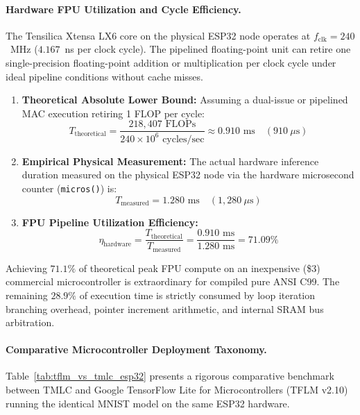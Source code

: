 \documentclass[11pt,a4paper]{article}
\begin{document}
\paragraph{Hardware FPU Utilization and Cycle Efficiency.}
The Tensilica Xtensa LX6 core on the physical ESP32 node operates at $f_{\text{clk}} = 240$~MHz ($4.167$~ns per clock cycle). The pipelined floating-point unit can retire one single-precision floating-point addition or multiplication per clock cycle under ideal pipeline conditions without cache misses.
\begin{enumerate}
    \item \textbf{Theoretical Absolute Lower Bound:} Assuming a dual-issue or pipelined MAC execution retiring 1 FLOP per cycle:
    \begin{equation}
        T_{\text{theoretical}} = \frac{218,407 \text{ FLOPs}}{240 \times 10^6 \text{ cycles/sec}} \approx 0.910 \text{ ms} \quad (910 \ \mu\text{s})
    \end{equation}
    \item \textbf{Empirical Physical Measurement:} The actual hardware inference duration measured on the physical ESP32 node via the hardware microsecond counter (\texttt{micros()}) is:
    \begin{equation}
        T_{\text{measured}} = 1.280 \text{ ms} \quad (1,280 \ \mu\text{s})
    \end{equation}
    \item \textbf{FPU Pipeline Utilization Efficiency:}
    \begin{equation}
        \eta_{\text{hardware}} = \frac{T_{\text{theoretical}}}{T_{\text{measured}}} = \frac{0.910 \text{ ms}}{1.280 \text{ ms}} = 71.09\%
    \end{equation}
\end{enumerate}
Achieving $71.1\%$ of theoretical peak FPU compute on an inexpensive (\$3) commercial microcontroller is extraordinary for compiled pure ANSI C99. The remaining $28.9\%$ of execution time is strictly consumed by loop iteration branching overhead, pointer increment arithmetic, and internal SRAM bus arbitration.

\paragraph{Comparative Microcontroller Deployment Taxonomy.}
Table~\ref{tab:tflm_vs_tmlc_esp32} presents a rigorous comparative benchmark between TMLC and Google TensorFlow Lite for Microcontrollers (TFLM v2.10) running the identical MNIST model on the same ESP32 hardware.
\end{document}
